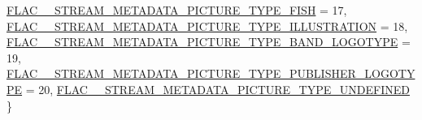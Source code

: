 \begin{DoxyCompactItemize}
\mbox{\hyperlink{group__flac__format_ggaf6d3e836cee023e0b8d897f1fdc9825dabbf0d7c519ae8ba8cec7d1f165f67b0f}{F\+L\+A\+C\+\_\+\+\_\+\+S\+T\+R\+E\+A\+M\+\_\+\+M\+E\+T\+A\+D\+A\+T\+A\+\_\+\+P\+I\+C\+T\+U\+R\+E\+\_\+\+T\+Y\+P\+E\+\_\+\+F\+I\+SH}} = 17, 
\mbox{\hyperlink{group__flac__format_ggaf6d3e836cee023e0b8d897f1fdc9825da89ba412c9d89c937c28afdab508d047a}{F\+L\+A\+C\+\_\+\+\_\+\+S\+T\+R\+E\+A\+M\+\_\+\+M\+E\+T\+A\+D\+A\+T\+A\+\_\+\+P\+I\+C\+T\+U\+R\+E\+\_\+\+T\+Y\+P\+E\+\_\+\+I\+L\+L\+U\+S\+T\+R\+A\+T\+I\+ON}} = 18, 
\mbox{\hyperlink{group__flac__format_ggaf6d3e836cee023e0b8d897f1fdc9825da751716a4528a78a8d53f435c816c4917}{F\+L\+A\+C\+\_\+\+\_\+\+S\+T\+R\+E\+A\+M\+\_\+\+M\+E\+T\+A\+D\+A\+T\+A\+\_\+\+P\+I\+C\+T\+U\+R\+E\+\_\+\+T\+Y\+P\+E\+\_\+\+B\+A\+N\+D\+\_\+\+L\+O\+G\+O\+T\+Y\+PE}} = 19, 
\newline
\mbox{\hyperlink{group__flac__format_ggaf6d3e836cee023e0b8d897f1fdc9825da31d75150a4079482fe122e703eff9141}{F\+L\+A\+C\+\_\+\+\_\+\+S\+T\+R\+E\+A\+M\+\_\+\+M\+E\+T\+A\+D\+A\+T\+A\+\_\+\+P\+I\+C\+T\+U\+R\+E\+\_\+\+T\+Y\+P\+E\+\_\+\+P\+U\+B\+L\+I\+S\+H\+E\+R\+\_\+\+L\+O\+G\+O\+T\+Y\+PE}} = 20, 
\mbox{\hyperlink{group__flac__format_ggaf6d3e836cee023e0b8d897f1fdc9825dae294ac8c7865c196fc52440fbbca9ad1}{F\+L\+A\+C\+\_\+\+\_\+\+S\+T\+R\+E\+A\+M\+\_\+\+M\+E\+T\+A\+D\+A\+T\+A\+\_\+\+P\+I\+C\+T\+U\+R\+E\+\_\+\+T\+Y\+P\+E\+\_\+\+U\+N\+D\+E\+F\+I\+N\+ED}}
 \}
\end{DoxyCompactItemize}
